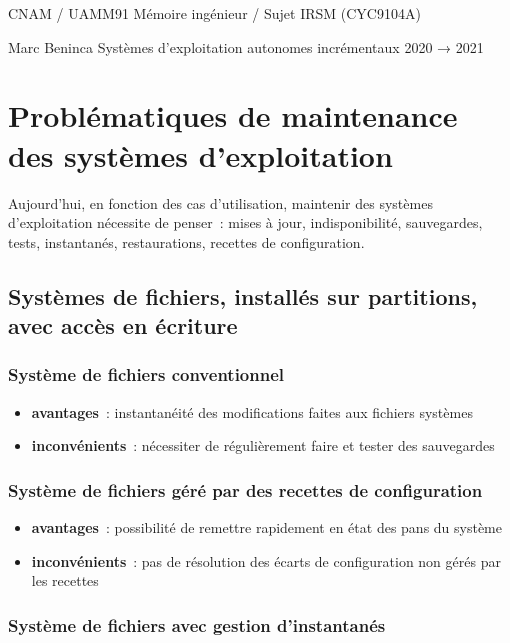 \documentclass[10pt]{article}
\newenvironment{itmz}{\begin{itemize}
\setlength{\itemsep}{0em}
}{\end{itemize}}
\begin{document}
CNAM / UAMM91 \hfill Mémoire ingénieur / Sujet \hfill IRSM (CYC9104A)

Marc Beninca \hfill Systèmes d’exploitation autonomes incrémentaux \hfill 2020 → 2021

\section{Problématiques de maintenance des systèmes d’exploitation}

Aujourd’hui, en fonction des cas d’utilisation, maintenir des systèmes d’exploitation nécessite de penser :
mises à jour, indisponibilité, sauvegardes, tests, instantanés, restaurations, recettes de configuration.

\subsection{Systèmes de fichiers, installés sur partitions, avec accès en écriture}

\subsubsection{Système de fichiers conventionnel}

\begin{itmz}
\item{\textbf{avantages} : instantanéité des modifications faites aux fichiers systèmes}
\item{\textbf{inconvénients} : nécessiter de régulièrement faire et tester des sauvegardes}
\end{itmz}

\subsubsection{Système de fichiers géré par des recettes de configuration}

\begin{itmz}
\item{\textbf{avantages} : possibilité de remettre rapidement en état des pans du système}
\item{\textbf{inconvénients} : pas de résolution des écarts de configuration non gérés par les recettes}
\end{itmz}

\subsubsection{Système de fichiers avec gestion d’instantanés}
\end{document}
